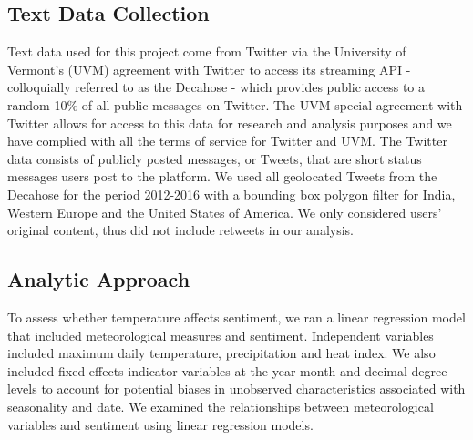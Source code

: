 \documentclass{article}
\begin{document}
\subsection{Text Data Collection}
Text data used for this project come from Twitter via the University of Vermont’s (UVM) agreement with Twitter to access its streaming API - colloquially referred to as the Decahose - which provides public access to a random 10\% of all public messages on Twitter. The UVM special agreement with Twitter allows for access to this data for research and analysis purposes and we have complied with all the terms of service for Twitter and UVM. 
The Twitter data consists of publicly posted messages, or Tweets, that are short status messages users post to the platform. We used all geolocated Tweets from the Decahose for the period 2012-2016 with a bounding box polygon filter for India, Western Europe and the United States of America. We only considered users’ original content, thus did not include retweets in our analysis.


\subsection{Analytic Approach}
To assess whether temperature affects sentiment, we ran a linear regression model that included meteorological measures and sentiment. Independent variables included maximum daily temperature, precipitation and heat index. We also included fixed effects indicator variables at the year-month and decimal degree levels to account for potential biases in unobserved characteristics associated with seasonality and date. We examined the relationships between meteorological variables and sentiment using linear regression models.
\end{document}
